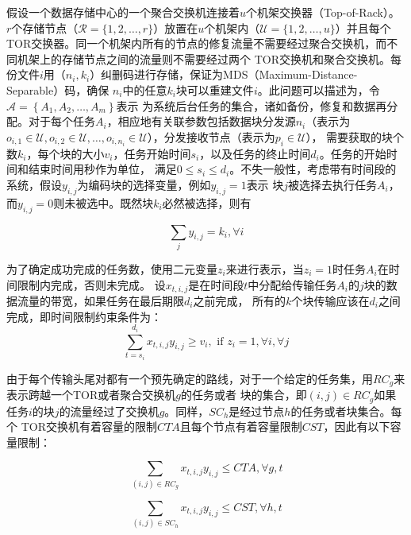 假设一个数据存储中心的一个聚合交换机连接着$u$个机架交换器（Top-of-Rack）。
$r$个存储节点（$\mathcal{R}=\{1,2, \ldots, r\}$）放置在$u$个机架内（$\mathcal{U}=\{1,2, \ldots, u\}$）并且每个
TOR交换器。同一个机架内所有的节点的修复流量不需要经过聚合交换机，而不同机架上的存储节点之间的流量则不需要经过两个
TOR交换机和聚合交换机。每份文件$i$用（$n_i, k_i$）纠删码进行存储，保证为MDS（Maximum-Distance-Separable）码，确保
$n_i$中的任意$k_i$块可以重建文件$i$。此问题可以描述为，令$\mathcal{A}=\left\{A_{1}, A_{2}, \ldots, A_{m}\right\}$表示
为系统后台任务的集合，诸如备份，修复和数据再分配。对于每个任务$A_i$，相应地有关联参数包括数据块分发源$n_i$（表示为
$o_{i, 1} \in \mathcal{U}, o_{i, 2} \in \mathcal{U}, \ldots, o_{i, n_{i}} \in \mathcal{U}$），分发接收节点（表示为$p_{i} \in \mathcal{U}$），
需要获取的块个数$k_i$，每个块的大小$v_i$，任务开始时间$s_i$，以及任务的终止时间$d_i$。任务的开始时间和结束时间用秒作为单位，
满足$0 \leq s_{i} \leq d_{i}$。不失一般性，考虑带有时间段的系统，假设$y_{i, j}$为编码块的选择变量，例如$y_{i, j}=1$表示
块$j$被选择去执行任务$A_i$，而$y_{i, j}=0$则未被选中。既然块$k_i$必然被选择，则有

\begin{equation}
	\label{eq:2-1}
	\sum_{j} y_{i, j}=k_{i}, \forall i
\end{equation}

为了确定成功完成的任务数，使用二元变量$z_i$来进行表示，当$z_i=1$时任务$A_i$在时间限制内完成，否则未完成。
设$x_{t, i, j}$是在时间段$t$中分配给传输任务$A_i$的$j$块的数据流量的带宽，如果任务在最后期限$d_i$之前完成，
所有的$k$个块传输应该在$d_i$之间完成，即时间限制约束条件为：
\begin{equation}
	\label{eq:2-2}
    \sum_{t=s_{i}}^{d_{i}} x_{t, i, j} y_{i, j} \geq v_{i}, \text { if } z_{i}=1, \forall i, \forall j
\end{equation}

由于每个传输头尾对都有一个预先确定的路线，对于一个给定的任务集，用$RC_g$来表示跨越一个TOR或者聚合交换机$g$的任务或者
块的集合，即$(i,j)\in RC_g$如果任务$i$的块$j$的流量经过了交换机$g$。同样，$SC_h$是经过节点$h$的任务或者块集合。每个
TOR交换机有着容量的限制$CTA$且每个节点有着容量限制$CST$，因此有以下容量限制：

\begin{equation}
	\label{eq:2-3}
    \sum_{(i, j) \in R C_{g}} x_{t, i, j} y_{i, j} \leq C T A, \forall g, t
\end{equation}


\begin{equation}
	\label{eq:2-4}
    \sum_{(i, j) \in S C_{h}} x_{t, i, j} y_{i, j} \leq C S T, \forall h, t
\end{equation}

